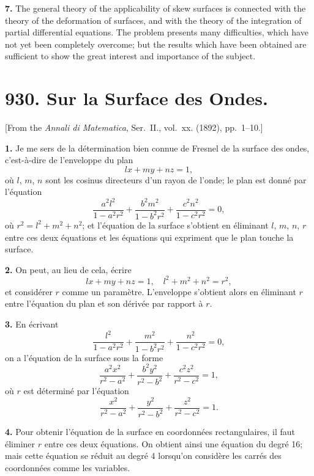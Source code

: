 \documentclass[12pt,a4paper]{article}
\begin{document}
\textbf{7.} The general theory of the applicability of skew surfaces is connected
with the theory of the deformation of surfaces, and with the theory of the
integration of partial differential equations. The problem presents many difficulties,
which have not yet been completely overcome; but the results which have been
obtained are sufficient to show the great interest and importance of the subject.



\newpage
\section*{930. Sur la Surface des Ondes.}

[From the \textit{Annali di Matematica}, Ser.~II., vol.~xx. (1892), pp.~1--10.]

\bigskip

\textbf{1.} Je me sers de la d\'etermination bien connue de Fresnel de la surface
des ondes, c'est-\`a-dire de l'enveloppe du plan
\[
lx + my + nz = 1,
\]
o\`u $l$, $m$, $n$ sont les cosinus directeurs d'un rayon de l'onde; le plan est donn\'e par
l'\'equation
\[
\frac{a^2l^2}{1-a^2r^2} + \frac{b^2m^2}{1-b^2r^2} + \frac{c^2n^2}{1-c^2r^2} = 0,
\]
o\`u $r^2 = l^2 + m^2 + n^2$; et l'\'equation de la surface s'obtient en \'eliminant $l$, $m$, $n$, $r$
entre ces deux \'equations et les \'equations qui expriment que le plan touche la surface.

\textbf{2.} On peut, au lieu de cela, \'ecrire
\[
lx + my + nz = 1, \quad l^2 + m^2 + n^2 = r^2,
\]
et consid\'erer $r$ comme un param\`etre. L'enveloppe s'obtient alors en \'eliminant
$r$ entre l'\'equation du plan et son d\'eriv\'ee par rapport \`a $r$.

\textbf{3.} En \'ecrivant
\[
\frac{l^2}{1-a^2r^2} + \frac{m^2}{1-b^2r^2} + \frac{n^2}{1-c^2r^2} = 0,
\]
on a l'\'equation de la surface sous la forme
\[
\frac{a^2x^2}{r^2-a^2} + \frac{b^2y^2}{r^2-b^2} + \frac{c^2z^2}{r^2-c^2} = 1,
\]
o\`u $r$ est d\'etermin\'e par l'\'equation
\[
\frac{x^2}{r^2-a^2} + \frac{y^2}{r^2-b^2} + \frac{z^2}{r^2-c^2} = 1.
\]

\textbf{4.} Pour obtenir l'\'equation de la surface en coordonn\'ees rectangulaires,
il faut \'eliminer $r$ entre ces deux \'equations. On obtient ainsi une \'equation du
degr\'e 16; mais cette \'equation se r\'eduit au degr\'e 4 lorsqu'on consid\`ere les
carr\'es des coordonn\'ees comme les variables.
\end{document}
